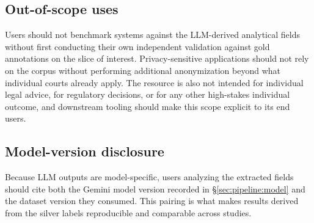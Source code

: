 \subsection{Out-of-scope uses}
\label{sec:limitations:out-of-scope}

Users should not benchmark systems against the LLM-derived analytical fields without first conducting their own independent validation against gold annotations on the slice of interest. Privacy-sensitive applications should not rely on the corpus without performing additional anonymization beyond what individual courts already apply. The resource is also not intended for individual legal advice, for regulatory decisions, or for any other high-stakes individual outcome, and downstream tooling should make this scope explicit to its end users.

\subsection{Model-version disclosure}
\label{sec:limitations:model-version}

Because LLM outputs are model-specific, users analyzing the extracted fields should cite both the Gemini model version recorded in \S\ref{sec:pipeline:model} and the dataset version they consumed. This pairing is what makes results derived from the silver labels reproducible and comparable across studies.
